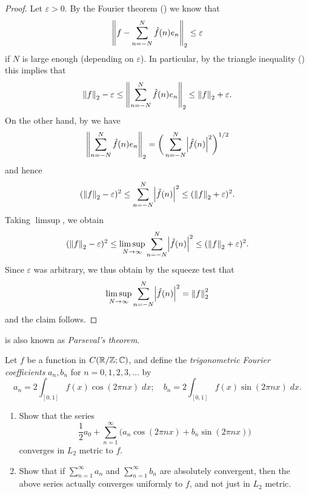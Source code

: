\begin{proof}
  Let \(\varepsilon > 0\).
  By the Fourier theorem () we know that
  \[
    \norm*{f - \sum_{n = -N}^N \hat{f}(n) e_n}_2 \leq \varepsilon
  \]
  if \(N\) is large enough (depending on \(\varepsilon\)).
  In particular, by the triangle inequality () this implies that
  \[
    \norm*{f}_2 - \varepsilon \leq \norm*{\sum_{n = -N}^N \hat{f}(n) e_n}_2 \leq \norm*{f}_2 + \varepsilon.
  \]
  On the other hand, by  we have
  \[
    \norm*{\sum_{n = -N}^N \hat{f}(n) e_n}_2 = \bigg(\sum_{n = -N}^N \abs{\hat{f}(n)}^2\bigg)^{1 / 2}
  \]
  and hence
  \[
    (\norm*{f}_2 - \varepsilon)^2 \leq \sum_{n = -N}^N \abs{\hat{f}(n)}^2 \leq (\norm*{f}_2 + \varepsilon)^2.
  \]
  Taking \(\limsup\), we obtain
  \[
    (\norm*{f}_2 - \varepsilon)^2 \leq \limsup_{N \to \infty} \sum_{n = -N}^N \abs{\hat{f}(n)}^2 \leq (\norm*{f}_2 + \varepsilon)^2.
  \]
  Since \(\varepsilon\) was arbitrary, we thus obtain by the squeeze test that
  \[
    \limsup_{N \to \infty} \sum_{n = -N}^N \abs{\hat{f}(n)}^2 = \norm*{f}_2^2
  \]
  and the claim follows.
\end{proof}

\begin{note}
   is also known as \emph{Parseval's theorem}.
\end{note}

\exercisesection

\begin{ex}\label{ii:ex:5.5.1}
  Let \(f\) be a function in \(C(\R / \Z ; \C)\), and define the \emph{trigonometric Fourier coefficients} \(a_n, b_n\) for \(n = 0, 1, 2, 3, \dots\) by
  \[
    a_n = 2 \int_{[0, 1]} f(x) \cos(2 \pi n x) \; dx; \quad b_n = 2 \int_{[0, 1]} f(x) \sin(2 \pi n x) \; dx.
  \]
  \begin{enumerate}
    \item\label{ii:ex:5.5.1.a} Show that the series
    \[
      \dfrac{1}{2} a_0 + \sum_{n = 1}^\infty \big(a_n \cos(2 \pi n x) + b_n \sin(2 \pi n x)\big)
    \]
    converges in \(L_2\) metric to \(f\).
    \item\label{ii:ex:5.5.1.b} Show that if \(\sum_{n = 1}^\infty a_n\) and \(\sum_{n = 1}^\infty b_n\) are absolutely convergent, then the above series actually converges uniformly to \(f\), and not just in \(L_2\) metric.
  \end{enumerate}
\end{ex}

